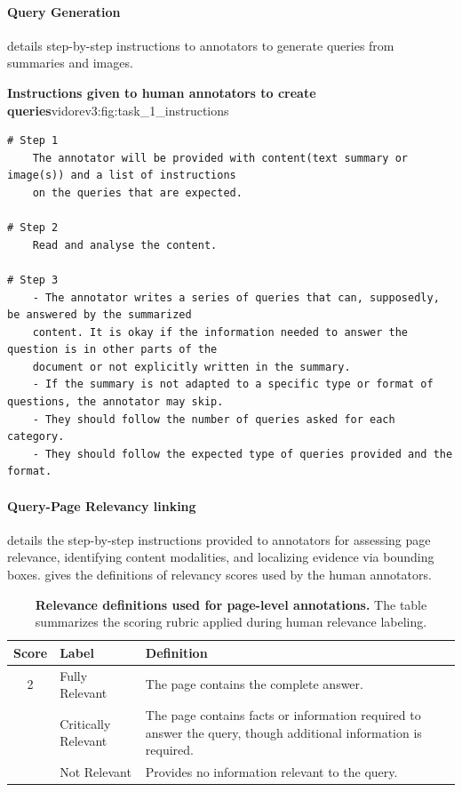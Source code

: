\paragraph{Query Generation} details step-by-step instructions to annotators to generate queries from summaries and images.

\begin{promptfigure}[blue!5]{\textbf{Instructions given to human annotators to create queries}}{vidorev3:fig:task_1_instructions}
\begin{Verbatim}[breaklines=true,breakanywhere=true,fontsize=\scriptsize]
# Step 1
    The annotator will be provided with content(text summary or image(s)) and a list of instructions
    on the queries that are expected.

# Step 2
    Read and analyse the content.

# Step 3
    - The annotator writes a series of queries that can, supposedly, be answered by the summarized
    content. It is okay if the information needed to answer the question is in other parts of the
    document or not explicitly written in the summary.
    - If the summary is not adapted to a specific type or format of questions, the annotator may skip. 
    - They should follow the number of queries asked for each category.
    - They should follow the expected type of queries provided and the format.
\end{Verbatim}
\end{promptfigure}


\paragraph{Query-Page Relevancy linking} details the step-by-step instructions provided to annotators for assessing page relevance, identifying content modalities, and localizing evidence via bounding boxes.  gives the definitions of relevancy scores used by the human annotators.

\begin{table}[htbp]
\centering
\small
\begin{tabularx}{0.8\textwidth}{clX} 
\toprule
\textbf{Score} & \textbf{Label} & \textbf{Definition} \\
\midrule
2 & Fully Relevant & The page contains the complete answer. \\ 
\addlinespace %
1 & Critically Relevant & The page contains facts or information required to answer the query, though additional information is required. \\ 
\addlinespace
0 & Not Relevant & Provides no information relevant to the query. \\
\bottomrule
\end{tabularx}
\caption[Page-level relevance annotation rubric]{\textbf{Relevance definitions used for page-level annotations.} The table summarizes the scoring rubric applied during human relevance labeling.}
\label{vidorev3:tab:relevance_scale}
\end{table}

